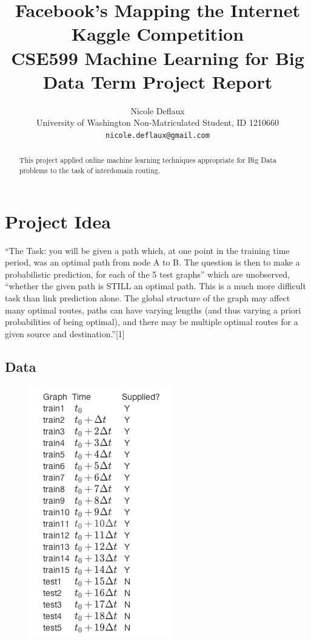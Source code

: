 \documentclass{article} %
\title{Facebook's Mapping the Internet Kaggle Competition \\
{\small CSE599 Machine Learning for Big Data Term Project Report}}
\author{Nicole Deflaux \\
University of Washington Non-Matriculated Student, ID 1210660 \\
\texttt{nicole.deflaux@gmail.com}
}
\begin{document}
\maketitle

\begin{abstract}
  This project applied online machine learning techniques appropriate for
  Big Data problems to the task of interdomain routing.
\end{abstract}

\tableofcontents

\section{Project Idea}
``The Task: you will be given a path which, at one point in the training time
period, was an optimal path from node A to B. The question is then to make a
probabilistic prediction, for each of the 5 test graphs'' which are
unobserved, ``whether the given path is STILL an optimal path.  This is a
much more difficult task than link prediction alone. The global structure of
the graph may affect many optimal routes, paths can have varying lengths
(and thus varying a priori probabilities of being optimal), and there may be
multiple optimal routes for a given source and destination.''[1]

\subsection{Data}

\begin{figure}
  \begin{center}
    \includegraphics[scale=.5]{trainAndTestGraphs.png}
  \end{center}
\end{figure}
\end{document}
